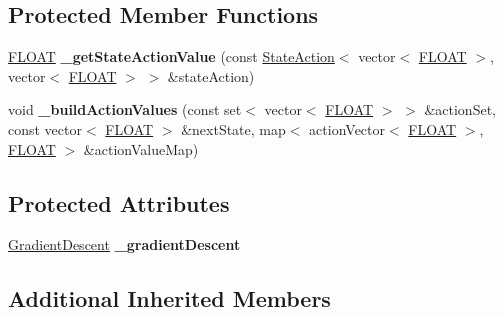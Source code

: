\subsection*{Protected Member Functions}
\begin{DoxyCompactItemize}
\item 
\hypertarget{classAI_1_1Algorithm_1_1ReinforcementLearningGD_ae03c74aee807bbf220c7e330666e3318}{\hyperlink{namespaceAI_a41b74884a20833db653dded3918e05c3}{F\-L\-O\-A\-T} {\bfseries \-\_\-get\-State\-Action\-Value} (const \hyperlink{classAI_1_1StateAction}{State\-Action}$<$ vector$<$ \hyperlink{namespaceAI_a41b74884a20833db653dded3918e05c3}{F\-L\-O\-A\-T} $>$, vector$<$ \hyperlink{namespaceAI_a41b74884a20833db653dded3918e05c3}{F\-L\-O\-A\-T} $>$ $>$ \&state\-Action)}\label{classAI_1_1Algorithm_1_1ReinforcementLearningGD_ae03c74aee807bbf220c7e330666e3318}

\item 
\hypertarget{classAI_1_1Algorithm_1_1ReinforcementLearningGD_a37eb184f5219dce30af3f60f1835999e}{void {\bfseries \-\_\-build\-Action\-Values} (const set$<$ vector$<$ \hyperlink{namespaceAI_a41b74884a20833db653dded3918e05c3}{F\-L\-O\-A\-T} $>$ $>$ \&action\-Set, const vector$<$ \hyperlink{namespaceAI_a41b74884a20833db653dded3918e05c3}{F\-L\-O\-A\-T} $>$ \&next\-State, map$<$ action\-Vector$<$ \hyperlink{namespaceAI_a41b74884a20833db653dded3918e05c3}{F\-L\-O\-A\-T} $>$, \hyperlink{namespaceAI_a41b74884a20833db653dded3918e05c3}{F\-L\-O\-A\-T} $>$ \&action\-Value\-Map)}\label{classAI_1_1Algorithm_1_1ReinforcementLearningGD_a37eb184f5219dce30af3f60f1835999e}

\end{DoxyCompactItemize}
\subsection*{Protected Attributes}
\begin{DoxyCompactItemize}
\item 
\hypertarget{classAI_1_1Algorithm_1_1ReinforcementLearningGD_a881c614b3deb26f39683386a72b76dda}{\hyperlink{classAI_1_1Algorithm_1_1GradientDescent}{Gradient\-Descent} {\bfseries \-\_\-gradient\-Descent}}\label{classAI_1_1Algorithm_1_1ReinforcementLearningGD_a881c614b3deb26f39683386a72b76dda}

\end{DoxyCompactItemize}
\subsection*{Additional Inherited Members}


